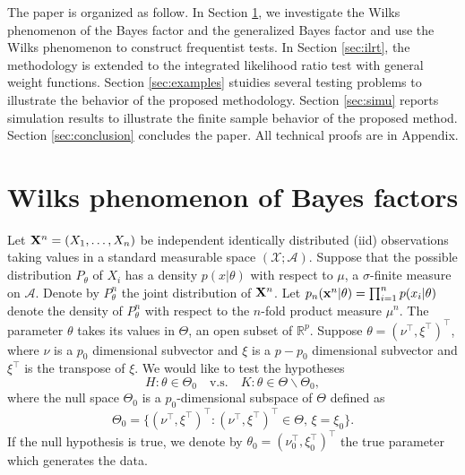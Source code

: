 \documentclass[11pt]{article}
\newcommand{\myT}{\intercal}
\theoremstyle{plain}
\theoremstyle{definition}
\theoremstyle{remark}
\begin{document}
The paper is organized as follow.
In Section \ref{sec:wilks}, we investigate the Wilks phenomenon of the Bayes factor and the generalized Bayes factor and use the Wilks phenomenon to construct frequentist tests.
In Section \ref{sec:ilrt}, the methodology is extended to the integrated likelihood ratio test with general weight functions.
Section \ref{sec:examples} stuidies several testing problems to illustrate the behavior of the proposed methodology.
Section \ref{sec:simu} reports simulation results to illustrate the finite sample behavior of the proposed method.
Section \ref{sec:conclusion} concludes the paper.
All technical proofs are in Appendix.






\section{Wilks phenomenon of Bayes factors} \label{sec:wilks}

Let $\mathbf{X}^{n}=(X_1,\ldots,X_n)$ be independent identically distributed (iid) observations taking values in a standard measurable space $(\mathcal{X};\mathscr{A})$.
Suppose that the possible distribution $P_\theta$ of $X_i$ has a density $p(x|\theta)$ with respect to $\mu$, a $\sigma$-finite measure on $\mathscr{A}$. %
Denote by $P_{\theta}^{n}$ the joint distribution of $\mathbf{X}^{n}$.
Let $p_{n}(\mathbf{x}^{n}|\theta)=\prod_{i=1}^n p(x_i|\theta)$ denote the density of $P_{\theta}^n$ with respect to the $n$-fold product measure $\mu^n$.
The parameter $\theta$ takes its values in $\Theta$, an open subset of $\mathbb{R}^{p}$.
Suppose $\theta=(\nu^\myT ,\xi^\myT )^\myT $, where $\nu$ is a $p_0$ dimensional subvector and $\xi$ is a $p-p_0$ dimensional subvector and $\xi^\myT$ is the transpose of $\xi$.
 We would like to test the hypotheses
\begin{equation*}
    H:\theta\in\Theta_0\quad \text{v.s.}\quad K:\theta\in\Theta\backslash \Theta_0,
\end{equation*}
where the null space $\Theta_0$ is a $p_0$-dimensional subspace of $\Theta$ defined as
\begin{equation*}
    \Theta_0=\{(\nu^\myT ,\xi^\myT )^\myT :(\nu^\myT ,\xi^\myT )^\myT \in\Theta, \, \xi=\xi_0\}.
\end{equation*}
If the null hypothesis is true, we denote by $\theta_0=(\nu_0^\myT ,\xi_0^\myT )^\myT $ the true parameter which generates the data.
\end{document}
